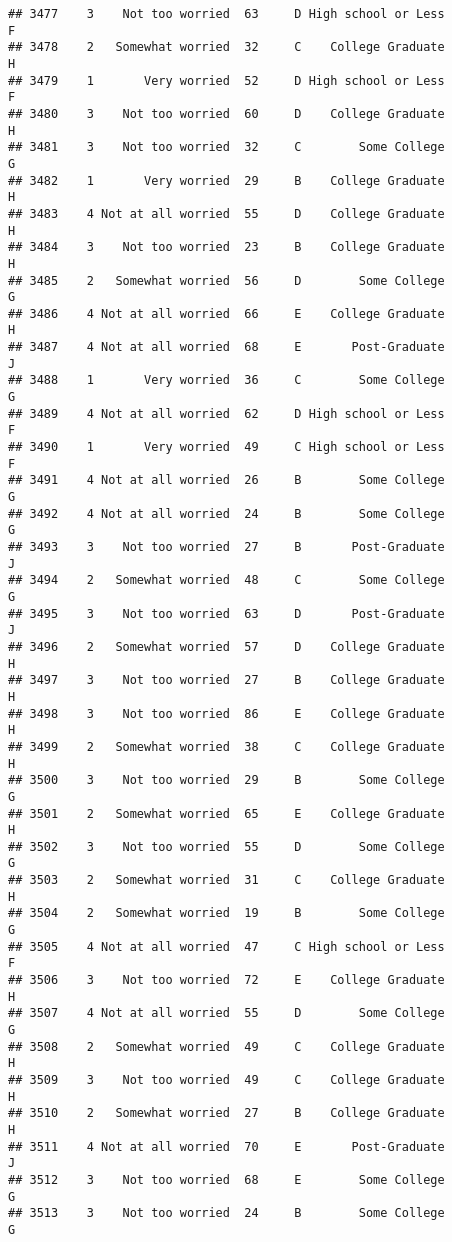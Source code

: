 \documentclass[
]{article}
\begin{document}
\begin{verbatim}
## 3477    3    Not too worried  63     D High school or Less         F
## 3478    2   Somewhat worried  32     C    College Graduate         H
## 3479    1       Very worried  52     D High school or Less         F
## 3480    3    Not too worried  60     D    College Graduate         H
## 3481    3    Not too worried  32     C        Some College         G
## 3482    1       Very worried  29     B    College Graduate         H
## 3483    4 Not at all worried  55     D    College Graduate         H
## 3484    3    Not too worried  23     B    College Graduate         H
## 3485    2   Somewhat worried  56     D        Some College         G
## 3486    4 Not at all worried  66     E    College Graduate         H
## 3487    4 Not at all worried  68     E       Post-Graduate         J
## 3488    1       Very worried  36     C        Some College         G
## 3489    4 Not at all worried  62     D High school or Less         F
## 3490    1       Very worried  49     C High school or Less         F
## 3491    4 Not at all worried  26     B        Some College         G
## 3492    4 Not at all worried  24     B        Some College         G
## 3493    3    Not too worried  27     B       Post-Graduate         J
## 3494    2   Somewhat worried  48     C        Some College         G
## 3495    3    Not too worried  63     D       Post-Graduate         J
## 3496    2   Somewhat worried  57     D    College Graduate         H
## 3497    3    Not too worried  27     B    College Graduate         H
## 3498    3    Not too worried  86     E    College Graduate         H
## 3499    2   Somewhat worried  38     C    College Graduate         H
## 3500    3    Not too worried  29     B        Some College         G
## 3501    2   Somewhat worried  65     E    College Graduate         H
## 3502    3    Not too worried  55     D        Some College         G
## 3503    2   Somewhat worried  31     C    College Graduate         H
## 3504    2   Somewhat worried  19     B        Some College         G
## 3505    4 Not at all worried  47     C High school or Less         F
## 3506    3    Not too worried  72     E    College Graduate         H
## 3507    4 Not at all worried  55     D        Some College         G
## 3508    2   Somewhat worried  49     C    College Graduate         H
## 3509    3    Not too worried  49     C    College Graduate         H
## 3510    2   Somewhat worried  27     B    College Graduate         H
## 3511    4 Not at all worried  70     E       Post-Graduate         J
## 3512    3    Not too worried  68     E        Some College         G
## 3513    3    Not too worried  24     B        Some College         G

\end{verbatim}
\end{document}

